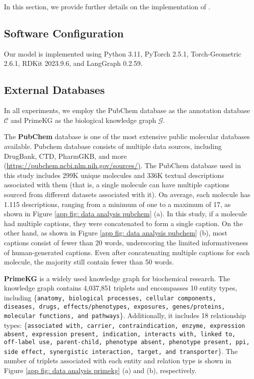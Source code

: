 In this section, we provide further details on the implementation of \proposed.

\subsection{Software Configuration}
Our model is implemented using Python 3.11, PyTorch 2.5.1, Torch-Geometric 2.6.1, RDKit 2023.9.6, and LangGraph 0.2.59.


\subsection{External Databases}
In all experiments, we employ the PubChem database \cite{kim2021pubchem} as the annotation database $\mathcal{C}$ and PrimeKG \cite{chandak2023building} as the biological knowledge graph $\mathcal{G}$.

The \textbf{PubChem} database is one of the most extensive public molecular databases available.
Pubchem database consists of multiple data sources, including DrugBank, CTD, PharmGKB, and more (\url{https://pubchem.ncbi.nlm.nih.gov/sources/)}.
The PubChem database used in this study includes 299K unique molecules and 336K textual descriptions associated with them (that is, a single molecule can have multiple captions sourced from different datasets associated with it). 
On average, each molecule has 1.115 descriptions, ranging from a minimum of one to a maximum of 17, as shown in Figure \ref{app fig: data analysis pubchem} (a).
In this study, if a molecule had multiple captions, they were concatenated to form a single caption.
On the other hand, as shown in Figure \ref{app fig: data analysis pubchem} (b), most captions consist of fewer than 20 words, underscoring the limited informativeness of human-generated captions. Even after concatenating multiple captions for each molecule, the majority still contain fewer than 50 words.


\textbf{PrimeKG} is a widely used knowledge graph for biochemical research.
The knowledge graph contains 4,037,851 triplets and encompasses 10 entity types, including \{\texttt{anatomy, biological processes, cellular components, diseases, drugs, effects/phenotypes, exposures, genes/proteins, molecular functions, and pathways}\}. 
Additionally, it includes 18 relationship types: \{\texttt{associated with, carrier, contraindication, enzyme, expression absent, expression present, indication, interacts with, linked to, off-label use, parent-child, phenotype absent, phenotype present, ppi, side effect, synergistic interaction, target, and transporter}\}.
The number of triplets associated with each entity and relation type is shown in Figure \ref{app fig: data analysis primekg} (a) and (b), respectively.

